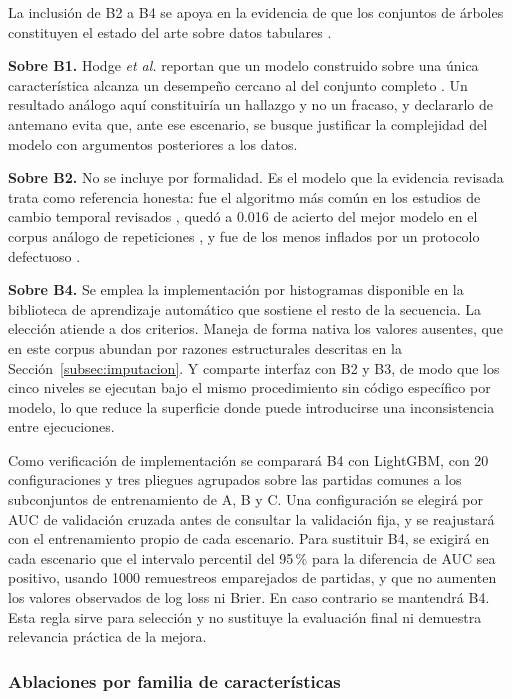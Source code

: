 La inclusión de B2 a B4 se apoya en la evidencia de que los conjuntos de
árboles constituyen el estado del arte sobre datos tabulares
\cite{borisov_tabular_2024,grinsztajn_trees_2022}.

\noindent\textbf{Sobre B1.} Hodge \textit{et al.} reportan que un modelo
construido sobre una única característica alcanza un desempeño cercano al
del conjunto completo \cite{hodge_winprediction_2021}. Un resultado análogo
aquí constituiría un hallazgo y no un fracaso, y declararlo de antemano evita
que, ante ese escenario, se busque justificar la complejidad del modelo con
argumentos posteriores a los datos.

\noindent\textbf{Sobre B2.} No se incluye por formalidad. Es el modelo que la
evidencia revisada trata como referencia honesta: fue el algoritmo más común
en los estudios de cambio temporal revisados \cite{guo_temporalshift_2021},
quedó a 0.016 de acierto del mejor modelo en el corpus análogo de
repeticiones \cite{bialecki_sc2egset_2023}, y fue de los menos inflados por
un protocolo defectuoso \cite{karbalaie_participantaware_2026}.

\noindent\textbf{Sobre B4.} Se emplea la implementación por histogramas
disponible en la biblioteca de aprendizaje automático que sostiene el resto
de la secuencia. La elección atiende a dos criterios. Maneja de forma nativa
los valores ausentes, que en este corpus abundan por razones estructurales
descritas en la Sección~\ref{subsec:imputacion}. Y comparte interfaz con B2 y
B3, de modo que los cinco niveles se ejecutan bajo el mismo procedimiento sin
código específico por modelo, lo que reduce la superficie donde puede
introducirse una inconsistencia entre ejecuciones.

Como verificación de implementación se comparará B4 con LightGBM, con
20 configuraciones y tres pliegues agrupados sobre las partidas comunes a
los subconjuntos de entrenamiento de A, B y C. Una configuración se elegirá
por AUC de validación cruzada antes de consultar la validación fija, y se
reajustará con el entrenamiento propio de cada escenario. Para sustituir B4,
se exigirá en cada escenario que el intervalo percentil del 95\,\% para la
diferencia de AUC sea positivo, usando 1000 remuestreos emparejados de
partidas, y que no aumenten los valores observados de log loss ni Brier.
En caso contrario se mantendrá B4. Esta regla sirve para selección y no
sustituye la evaluación final ni demuestra relevancia práctica de la mejora.

\subsubsection{Ablaciones por familia de características}

